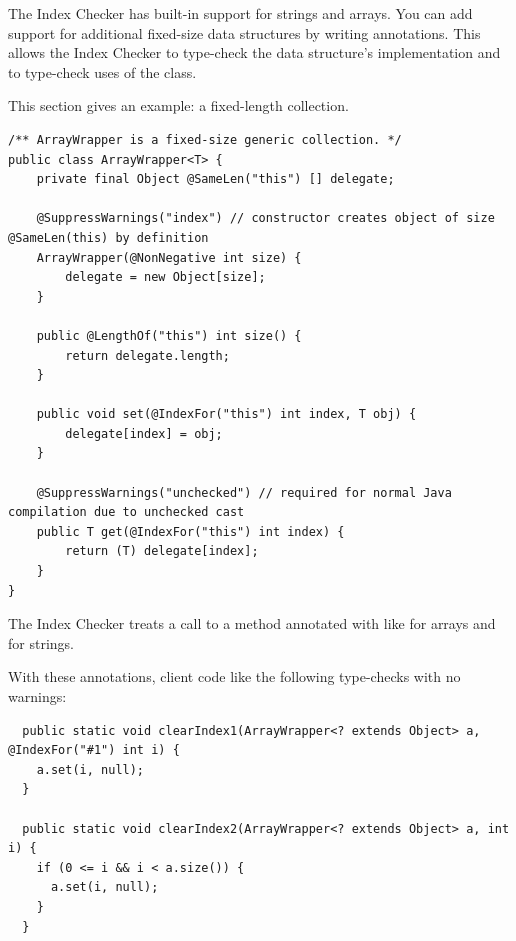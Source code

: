 
The Index Checker has built-in support for strings and arrays.
You can add support for additional fixed-size data structures by writing
annotations.
This allows the Index Checker to type-check the data structure's
implementation and to type-check uses of the class.

This section gives an example:  a fixed-length collection.


\begin{Verbatim}
/** ArrayWrapper is a fixed-size generic collection. */
public class ArrayWrapper<T> {
    private final Object @SameLen("this") [] delegate;

    @SuppressWarnings("index") // constructor creates object of size @SameLen(this) by definition
    ArrayWrapper(@NonNegative int size) {
        delegate = new Object[size];
    }

    public @LengthOf("this") int size() {
        return delegate.length;
    }

    public void set(@IndexFor("this") int index, T obj) {
        delegate[index] = obj;
    }

    @SuppressWarnings("unchecked") // required for normal Java compilation due to unchecked cast
    public T get(@IndexFor("this") int index) {
        return (T) delegate[index];
    }
}
\end{Verbatim}

The Index Checker treats a call to a method annotated with 
like  for arrays and  for strings.

With these annotations, client code like the following type-checks with no
warnings:
\begin{Verbatim}
  public static void clearIndex1(ArrayWrapper<? extends Object> a, @IndexFor("#1") int i) {
    a.set(i, null);
  }

  public static void clearIndex2(ArrayWrapper<? extends Object> a, int i) {
    if (0 <= i && i < a.size()) {
      a.set(i, null);
    }
  }
\end{Verbatim}


\iffalse %

